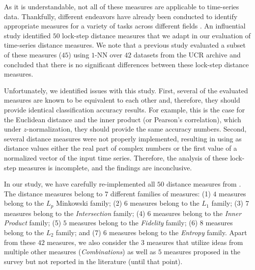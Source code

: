 \documentclass[11pt]{article}
\begin{document}
As it is understandable, not all of these measures are applicable to time-series data. Thankfully, different endeavors have already been conducted to identify appropriate measures for a variety of tasks across different fields \cite{zezula2006similarity,gavin2003statistical}. An influential study \cite{cha2007comprehensive} identified $50$ lock-step distance measures that we adapt in our evaluation of time-series distance measures. We note that a previous study \cite{giusti2013empirical} evaluated a subset of these measures ($45$) using $1$-NN over $42$ datasets from the UCR archive and concluded that there is no significant differences between these lock-step distance measures.

Unfortunately, we identified issues with this study. First, several of the evaluated measures are known to be equivalent to each other and, therefore, they should provide identical classification accuracy results. For example, this is the case for the Euclidean distance and the inner product (or Pearson's correlation), which under $z$-normalization, they should provide the same accuracy numbers. Second, several distance measures were not properly implemented, resulting in using as distance values either the real part of complex numbers or the first value of a normalized vector of the input time series. Therefore, the analysis of these lock-step measures is incomplete, and the findings are inconclusive.

In our study, we have carefully re-implemented all $50$ distance measures from \cite{cha2007comprehensive}. The distance measures belong to $7$ different families of measures: (1) $4$ measures belong to the $L_p$ Minkowski family; (2) $6$ measures belong to the $L_1$ family; (3) $7$ measures belong to the {\em Intersection} family; (4) $6$ measures belong to the {\em Inner Product} family; (5) $5$ measures belong to the {\em Fidelity} family; (6) $8$ measures belong to the $L_2$ family; and (7) $6$ measures belong to the {\em Entropy} family. Apart from these $42$ measures, we also consider the $3$ measures that utilize ideas from multiple other measures ({\em Combinations}) as well as $5$ measures proposed in the survey but not reported in the literature (until that point).
\end{document}
